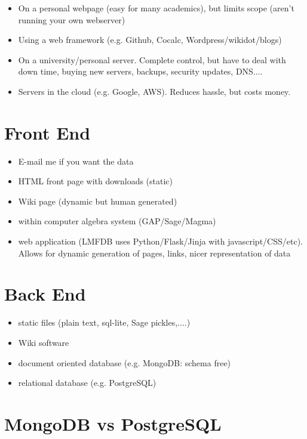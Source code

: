 \documentclass{article}
\begin{document}
\begin{itemize}
\item On a personal webpage (easy for many academics), but limits scope (aren't running your own webserver)
\item Using a web framework (e.g. Github, Cocalc, Wordpress/wikidot/blogs)
\item On a university/personal server.  Complete control, but have to deal with down time, buying new servers, backups, security updates, DNS....
\item Servers in the cloud (e.g. Google, AWS).  Reduces hassle, but costs money.
\end{itemize}

\section{Front End}

\begin{itemize}
\item E-mail me if you want the data
\item HTML front page with downloads (static)
\item Wiki page (dynamic but human generated)
\item within computer algebra system (GAP/Sage/Magma)
\item web application (LMFDB uses Python/Flask/Jinja with javascript/CSS/etc).  Allows for dynamic generation of pages, links, nicer representation of data
\end{itemize}

\section{Back End}

\begin{itemize}
\item static files (plain text, sql-lite, Sage pickles,....)
\item Wiki software
\item document oriented database (e.g. MongoDB: schema free)
\item relational database (e.g. PostgreSQL)
\end{itemize}


\section{MongoDB vs PostgreSQL}
\end{document}
